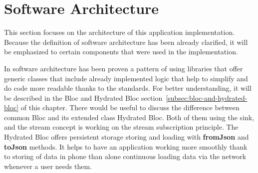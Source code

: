 \section{Software Architecture}\label{sec:software-architecture}
This section focuses on the architecture of this application implementation.
Because the definition of software architecture has been already clarified, it will be emphasized to certain components that were used in the implementation.

In software architecture has been proven a pattern of using libraries that offer generic classes that include already implemented logic that help to simplify and do code more readable thanks to the standards.
For better understanding, it will be described in the Bloc and Hydrated Bloc section~\ref{subsec:bloc-and-hydrated-bloc} of this chapter.
\newpage
There would be useful to discuss the difference between common Bloc and its extended class Hydrated Bloc.
Both of them using the sink, and the stream concept is working on the stream subscription principle.
The Hydrated Bloc offers persistent storage storing and loading with \textbf{fromJson} and \textbf{toJson} methods.
It helps to have an application working more smoothly thank to storing of data in phone than alone continuous loading data via the network whenever a user needs them.









